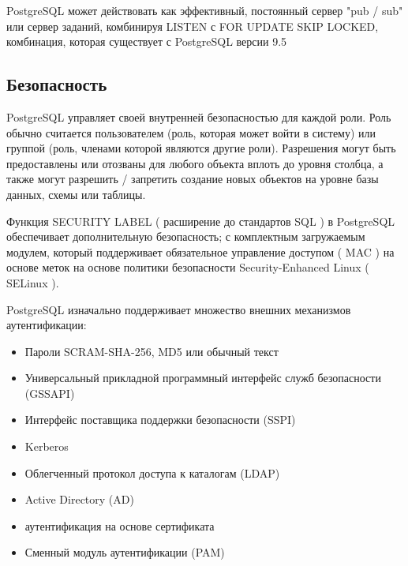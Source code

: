 PostgreSQL может действовать как эффективный, постоянный сервер "pub / sub" или сервер заданий, комбинируя LISTEN с FOR UPDATE SKIP LOCKED, комбинация, которая существует с PostgreSQL версии 9.5


\subsection{Безопасность}\label{sec:subs9}
PostgreSQL управляет своей внутренней безопасностью для каждой роли. Роль обычно считается пользователем (роль, которая может войти в систему) или группой (роль, членами которой являются другие роли). Разрешения могут быть предоставлены или отозваны для любого объекта вплоть до уровня столбца, а также могут разрешить / запретить создание новых объектов на уровне базы данных, схемы или таблицы.


Функция SECURITY LABEL ( расширение до стандартов SQL ) в PostgreSQL обеспечивает дополнительную безопасность; с комплектным загружаемым модулем, который поддерживает обязательное управление доступом ( MAC ) на основе меток на основе политики безопасности Security-Enhanced Linux ( SELinux ).


PostgreSQL изначально поддерживает множество внешних механизмов аутентификации:
\begin{itemize}
  \item Пароли SCRAM-SHA-256, MD5 или обычный текст
  \item Универсальный прикладной программный интерфейс служб безопасности (GSSAPI)
  \item Интерфейс поставщика поддержки безопасности (SSPI)
  \item Kerberos
  \item Облегченный протокол доступа к каталогам (LDAP)
  \item Active Directory (AD)
  \item аутентификация на основе сертификата
  \item Сменный модуль аутентификации (PAM)
\end{itemize}



